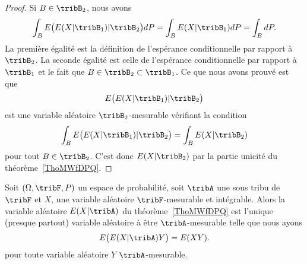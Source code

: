\begin{proof}
    Si \( B\in\tribB_2\), nous avons
    \begin{equation}
        \int_BE\big( E(X|\tribB_1)|\tribB_2 \big)dP=\int_B E(X|\tribB_1)dP=\int_BdP.
    \end{equation}
    La première égalité est la définition de l'espérance conditionnelle par rapport à \( \tribB_2\). La seconde égalité est celle de l'espérance conditionnelle par rapport à \( \tribB_1\) et le fait que \( B\in\tribB_2\subset\tribB_1\). Ce que nous avons prouvé est que
    \begin{equation}
        E\big( E(X|\tribB_1)|\tribB_2 \big)
    \end{equation}
    est une variable aléatoire \( \tribB_2\)-mesurable vérifiant la condition
    \begin{equation}
        \int_BE\big( E(X|\tribB_1)|\tribB_2 \big)=\int_BE(X|\tribB_2)
    \end{equation}
    pour tout \( B\in \tribB_2\). C'est donc \( E(X|\tribB_2)\) par la partie unicité du théorème~\ref{ThoMWfDPQ}.
\end{proof}

\begin{proposition}
    Soit \( (\Omega,\tribF,P)\) un espace de probabilité, soit \( \tribA\) une sous tribu de \( \tribF\) et \( X\), une variable aléatoire \( \tribF\)-mesurable et intégrable. Alors la variable aléatoire \( E(X|\tribA)\) du théorème~\ref{ThoMWfDPQ} est l'unique (presque partout) variable aléatoire à être \( \tribA\)-mesurable telle que nous ayons
    \begin{equation}
        E\big( E(X|\tribA)Y \big)=E(XY).
    \end{equation}
    pour toute variable aléatoire \( Y\) \( \tribA\)-mesurable.
\end{proposition}

